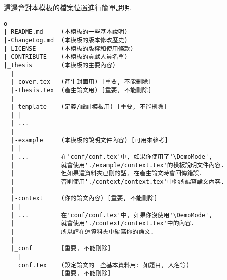 
這邊會對本模板的檔案位置進行簡單說明.\\

\begin{DescriptionFrame}
\begin{verbatim}
o
|-README.md     (本模板的一些基本說明)
|-ChangeLog.md  (本模板的版本修改歷史)
|-LICENSE       (本模板的版權和使用條款)
|-CONTRIBUTE    (本模板的貢獻人員名單)
|_thesis        (本模板的主要內容)
  |
  |-cover.tex   (產生封面用) [重要, 不能刪除]
  |-thesis.tex  (產生論文用) [重要, 不能刪除]
  |
  |-template    (定義/設計模板用) [重要, 不能刪除]
  | |
  | ...
  |
  |-example     (本模板的說明文件內容) [可用來參考]
  | |
  | ...         在'conf/conf.tex'中, 如果你使用了'\DemoMode',
  |             就會使用'./example/context.tex'的模板說明文件內容.
  |             但如果這資料夾已刪的話, 在產生論文時會回傳錯誤.
  |             否則使用'./context/context.tex'中你所編寫論文內容.
  |
  |-context     (你的論文內容) [重要, 不能刪除]
  | |
  | ...         在'conf/conf.tex'中, 如果你沒使用'\DemoMode',
  |             就會使用'./context/context.tex'中的內容.
  |             所以請在這資料夾中編寫你的論文.
  |
  |_conf        [重要, 不能刪除]
    |
    conf.tex    (設定論文的一些基本資料用: 如題目, 人名等)
                [重要, 不能刪除]
\end{verbatim}
\end{DescriptionFrame}
